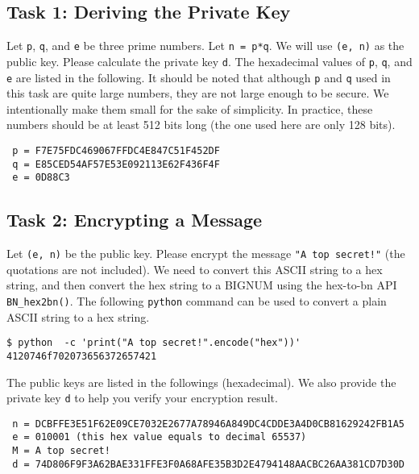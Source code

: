 \subsection{Task 1: Deriving the Private Key}

Let \texttt{p}, \texttt{q}, and \texttt{e} be three prime numbers. Let \texttt{n = p*q}.
We will use \texttt{(e, n)} as the public key. Please calculate the private key \texttt{d}.
The hexadecimal values of \texttt{p}, \texttt{q}, and \texttt{e} are listed in the following. It should be
noted that although \texttt{p} and \texttt{q} used in this task are quite large numbers, they are not large
enough to be secure. We intentionally make them small for the sake of simplicity. In practice,
these numbers should be at least 512 bits long (the one used here are only 128 bits).

\begin{lstlisting}
 p = F7E75FDC469067FFDC4E847C51F452DF
 q = E85CED54AF57E53E092113E62F436F4F
 e = 0D88C3
\end{lstlisting}


\subsection{Task 2: Encrypting a Message}

Let \texttt{(e, n)} be the public key. Please encrypt the message
\texttt{"A top secret!"} (the quotations are not included).
We need to convert this ASCII string to a hex string, and then
convert the hex string to a BIGNUM using the hex-to-bn API \texttt{BN\_hex2bn()}.
The following \texttt{python} command can be used
to convert a plain ASCII string to a hex string.

\begin{lstlisting}
$ python  -c 'print("A top secret!".encode("hex"))'
4120746f702073656372657421
\end{lstlisting}


The public keys are listed in the followings (hexadecimal).  We also provide the private key \texttt{d}
 to help you verify your encryption
result.

\begin{lstlisting}
 n = DCBFFE3E51F62E09CE7032E2677A78946A849DC4CDDE3A4D0CB81629242FB1A5
 e = 010001 (this hex value equals to decimal 65537)
 M = A top secret!
 d = 74D806F9F3A62BAE331FFE3F0A68AFE35B3D2E4794148AACBC26AA381CD7D30D
\end{lstlisting}



